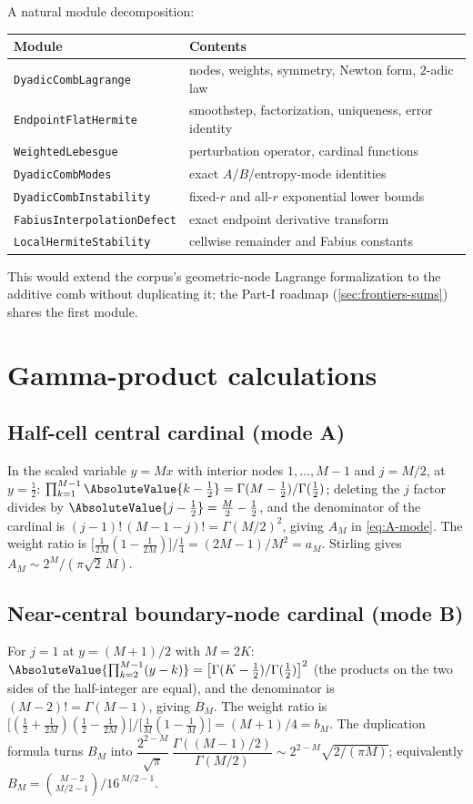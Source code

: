 \documentclass[11pt,oneside]{article}
\numberwithin{equation}{section}
\theoremstyle{definition}
\theoremstyle{remark}
\begin{document}
A natural module decomposition:
\begin{center}
\small
\begin{tabular}{@{}ll@{}}
\toprule
Module & Contents \\
\midrule
\nolinkurl{DyadicCombLagrange} & nodes, weights, symmetry, Newton form, $2$-adic law \\
\nolinkurl{EndpointFlatHermite} & smoothstep, factorization, uniqueness, error identity \\
\nolinkurl{WeightedLebesgue} & perturbation operator, cardinal functions \\
\nolinkurl{DyadicCombModes} & exact $A$/$B$/entropy-mode identities \\
\nolinkurl{DyadicCombInstability} & fixed-$r$ and all-$r$ exponential lower bounds \\
\nolinkurl{FabiusInterpolationDefect} & exact endpoint derivative transform \\
\nolinkurl{LocalHermiteStability} & cellwise remainder and Fabius constants \\
\bottomrule
\end{tabular}
\end{center}
This would extend the corpus's geometric-node Lagrange formalization
to the additive comb without duplicating it; the Part-I roadmap
(\cref{sec:frontiers-sums}) shares the first module.

\appendix

\section{Gamma-product calculations}
\label{app:gamma}

\subsection{Half-cell central cardinal (mode A)}
In the scaled variable $y=Mx$ with interior nodes $1,\dots,M-1$ and
$j=M/2$, at $y=\tfrac12$:
$\prod_{k=1}^{M-1}\AbsoluteValue{k-\tfrac12}=\Gamma(M-\tfrac12)/\Gamma(\tfrac12)$;
deleting the $j$ factor divides by $\AbsoluteValue{j-\tfrac12}=\tfrac M2-\tfrac12$,
and the denominator of the cardinal is
$(j-1)!\,(M-1-j)!=\Gamma(M/2)^{2}$, giving $A_M$ in
\eqref{eq:A-mode}.  The weight ratio is
$\bigl[\tfrac1{2M}(1-\tfrac1{2M})\bigr]/\tfrac14=(2M-1)/M^{2}=a_M$.
Stirling gives $A_M\sim2^{M}/(\pi\sqrt2\,M)$.

\subsection{Near-central boundary-node cardinal (mode B)}
For $j=1$ at $y=(M+1)/2$ with $M=2K$:
$\AbsoluteValue{\prod_{k=2}^{M-1}(y-k)}
=\bigl[\Gamma(K-\tfrac12)/\Gamma(\tfrac12)\bigr]^{2}$
(the products on the two sides of the half-integer are equal), and
the denominator is $(M-2)!=\Gamma(M-1)$, giving $B_M$.  The weight
ratio is
$\bigl[(\tfrac12+\tfrac1{2M})(\tfrac12-\tfrac1{2M})\bigr]
/\bigl[\tfrac1M(1-\tfrac1M)\bigr]=(M+1)/4=b_M$.  The duplication
formula turns $B_M$ into
$\dfrac{2^{2-M}}{\sqrt\pi}\,
\dfrac{\Gamma((M-1)/2)}{\Gamma(M/2)}
\sim2^{2-M}\sqrt{2/(\pi M)}$; equivalently
$B_M=\binom{M-2}{M/2-1}\big/16^{\,M/2-1}$.
\end{document}
